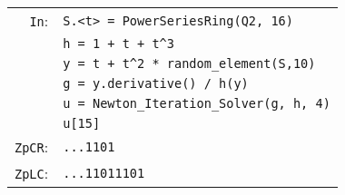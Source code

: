 \documentclass[sigconf]{acmart}
\newcommand{\cIn}{{\color{input} \tt \phantom{Zp}In}:}
\newcommand{\cZpCR}{{\color{output} \tt ZpCR}:}
\newcommand{\cZpLC}{{\color{output} \tt ZpLC}:}
\theoremstyle{definition}
\begin{document}
\smallskip

{\noindent \small
\begin{tabular}{rl}
\cIn
 & \verb?S.<t> = ?{\color{constructor}\verb?PowerSeriesRing?}\verb?(?{\color{ring}\verb?Q2?}\verb?, 16)? \\
 & \verb?h = 1 + t + t^3? \\
 & \verb?y = t + t^2 * ?{\color{function}\verb?random_element?}\verb?(S,10)? \\
 & \verb?g = y.derivative() / h(y)? \\
 & \verb?u = ?{\color{function}\verb?Newton_Iteration_Solver?}\verb?(g, h, 4)? \\
 & \verb?u[15]? \\
\cZpCR
 & \verb?...1101? \\
\cZpLC
 & \verb?...11011101? \\
\end{tabular}}

\end{document}
